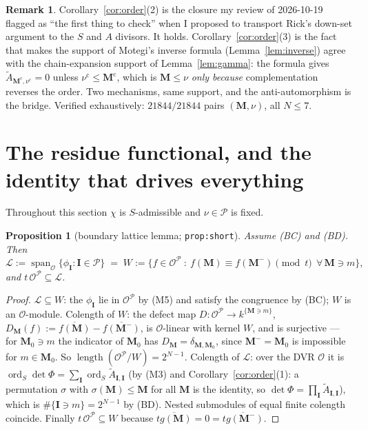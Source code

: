 \documentclass[11pt]{article}
\newtheorem{prop}[thm]{Proposition}
\theoremstyle{definition}
\newtheorem{rem}[thm]{Remark}
\newcommand{\At}{\widetilde{A}}
\newcommand{\bM}{\mathbf{M}}
\newcommand{\bI}{\mathbf{I}}
\newcommand{\ord}{\operatorname{ord}}
\newcommand{\Lat}{\mathcal{L}}
\begin{document}
\begin{rem}
Corollary~\ref{cor:order}(2) is the closure my review of 2026-10-19 flagged as
``the first thing to check'' when I proposed to transport Rick's down-set
argument to the $S$ and $A$ divisors.  It holds.  Corollary~\ref{cor:order}(3) is
the fact that makes the support of Motegi's inverse formula
(Lemma~\ref{lem:inverse}) agree with the chain-expansion support of
Lemma~\ref{lem:gamma}: the formula gives $\At_{\bM^{\mathrm c},\nu^{\mathrm c}}=0$
unless $\nu^{\mathrm c}\le\bM^{\mathrm c}$, which is $\bM\le\nu$ \emph{only
because} complementation reverses the order.  Two mechanisms, same support, and
the anti-automorphism is the bridge.  Verified exhaustively: $21844/21844$ pairs $(\bM,\nu)$, all $N\le7$.
\end{rem}

\section{The residue functional, and the identity that drives everything}
\label{sec:res}

Throughout this section $\chi$ is $S$-admissible and $\nu\in\mathcal{P}$ is fixed.

\begin{prop}[boundary lattice lemma; \texttt{prop:short}]\label{prop:lat}
Assume \textup{(BC)} and \textup{(BD)}.  Then
\[
  \Lat:=\operatorname{span}_{\mathcal{O}}\{\phi_{\bI}:\bI\in\mathcal{P}\}
  \;=\;
  W:=\{f\in\mathcal{O}^{\mathcal{P}}\ :\ f(\bM)\equiv f(\bM^{-})\!\!\pmod t
       \ \ \forall\,\bM\ni m\},
\]
and $t\,\mathcal{O}^{\mathcal{P}}\subseteq\Lat$.
\end{prop}

\begin{proof}
$\Lat\subseteq W$: the $\phi_{\bI}$ lie in $\mathcal{O}^{\mathcal{P}}$ by (M5)
and satisfy the congruence by (BC); $W$ is an $\mathcal{O}$-module.
Colength of $W$: the defect map
$D:\mathcal{O}^{\mathcal{P}}\to k^{\{\bM\ni m\}}$,
$D_{\bM}(f):=\overline{f(\bM)}-\overline{f(\bM^{-})}$, is $\mathcal{O}$-linear with
kernel $W$, and is surjective --- for $\bM_0\ni m$ the indicator of $\bM_0$ has
$D_{\bM}=\delta_{\bM,\bM_0}$, since $\bM^{-}=\bM_0$ is impossible for
$m\in\bM_0$.  So $\operatorname{length}(\mathcal{O}^{\mathcal{P}}/W)=2^{N-1}$.
Colength of $\Lat$: over the DVR $\mathcal{O}$ it is
$\ord_S\det\Phi=\sum_{\bI}\ord_S\At_{\bI,\bI}$ (by (M3) and
Corollary~\ref{cor:order}(1): a permutation $\sigma$ with $\sigma(\bM)\le\bM$ for
all $\bM$ is the identity, so $\det\Phi=\prod_{\bI}\At_{\bI,\bI}$), which is
$\#\{\bI\ni m\}=2^{N-1}$ by (BD).  Nested submodules of equal finite colength
coincide.  Finally $t\,\mathcal{O}^{\mathcal{P}}\subseteq W$ because
$\overline{tg(\bM)}=0=\overline{tg(\bM^{-})}$.
\end{proof}
\end{document}
